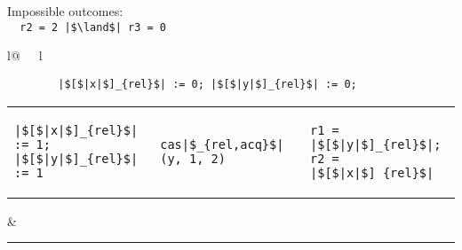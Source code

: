 \begin{minipage}[t]{0.3\linewidth}
Impossible outcomes:\\
\lstinline{  r2 = 2 |$\land$| r3 = 0}\\
\end{minipage}
%
\begin{minipage}[t]{0.3\linewidth}
\vspace{-.2cm}
  \begin{tabular}{l@{\ \ \ }l}
    \begin{minipage}[l]{4.3cm} \small
\begin{lstlisting}
        |$[$|x|$]_{rel}$| := 0; |$[$|y|$]_{rel}$| := 0;
\end{lstlisting}
\vspace{-.2cm}
\begin{tabular}{l||l||l}
\begin{lstlisting}
|$[$|x|$]_{rel}$| := 1;
|$[$|y|$]_{rel}$| := 1
\end{lstlisting}
\hspace{.6cm}
&
\begin{lstlisting}
cas|$_{rel,acq}$|(y, 1, 2)
\end{lstlisting}
\hspace{.6cm}
&
\begin{lstlisting}
r1 = |$[$|y|$]_{rel}$|;
r2 = |$[$|x|$]_{rel}$|
\end{lstlisting}
\end{tabular}
    \end{minipage}
&
  \end{tabular}
\end{minipage}
\vspace{.2cm}
\hrule
\vspace{.2cm}

